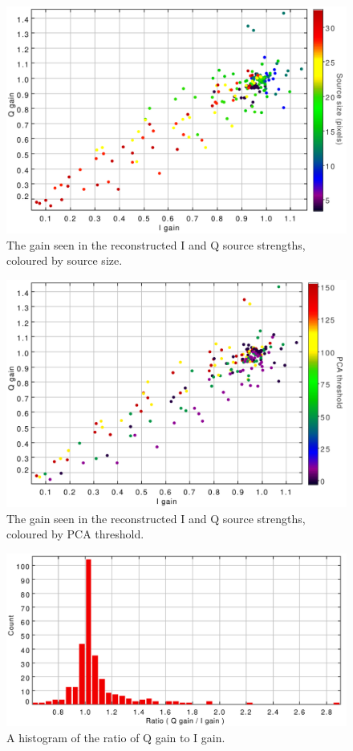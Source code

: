 \documentclass[twoside,11pt]{starlink}
\begin{document}
\begin{figure}
\includegraphics[width=0.9\columnwidth]{figs/iqgain-ssize}
\caption{The gain seen in the reconstructed I and Q source strengths,
coloured by source size.}
\label{fig:iqgain-ssize}
\end{figure}

\begin{figure}
\includegraphics[width=0.9\columnwidth]{figs/iqgain-pt}
\caption{The gain seen in the reconstructed I and Q source strengths,
coloured by PCA threshold.}
\label{fig:iqgain-pt}
\end{figure}

\begin{figure}
\includegraphics[width=0.9\columnwidth]{figs/ratio}
\caption{A histogram of the ratio of Q gain to I gain.}
\label{fig:ratio}
\end{figure}
\end{document}
